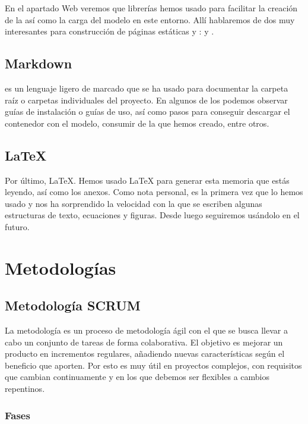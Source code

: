 En el apartado Web veremos que librerías hemos usado para facilitar la creación de la  así como la carga del modelo en este entorno. Allí hablaremos de dos  muy interesantes para construcción de páginas estáticas y :  y .

\subsection{Markdown}

 es un lenguaje ligero de marcado que se ha usado para documentar la carpeta raíz o carpetas individuales del proyecto. En algunos de los  podemos observar guías de instalación o guías de uso, así como pasos para conseguir descargar el contenedor con el modelo, consumir de la  que hemos creado, entre otros.

\subsection{\LaTeX}

Por último, LaTeX. Hemos usado LaTeX para generar esta memoria que estás leyendo, así como los anexos. Como nota personal, es la primera vez que lo hemos usado y nos ha sorprendido la velocidad con la que se escriben algunas estructuras de texto, ecuaciones y figuras. Desde luego seguiremos usándolo en el futuro.


\section{Metodologías}

\subsection{Metodología SCRUM}

La metodología  es un proceso de metodología ágil con el que se busca llevar a cabo un conjunto de tareas de forma colaborativa. El objetivo es mejorar un producto en incrementos regulares, añadiendo nuevas características según el beneficio que aporten. Por esto es muy útil en proyectos complejos, con requisitos que cambian continuamente y en los que debemos ser flexibles a cambios repentinos.

\subsubsection{Fases}

